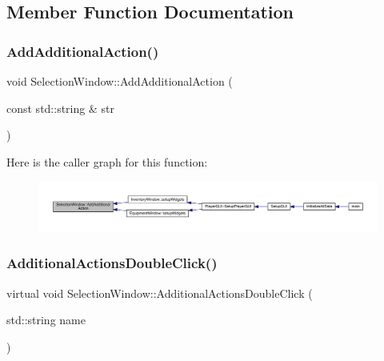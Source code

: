 \subsection{Member Function Documentation}
\mbox{\label{class_selection_window_ad520a06caa0f206afcd0f07eb2489066}} 
\subsubsection{\texorpdfstring{Add\+Additional\+Action()}{AddAdditionalAction()}}
{\footnotesize\ttfamily void Selection\+Window\+::\+Add\+Additional\+Action (\begin{DoxyParamCaption}\item[{const std\+::string \&}]{str }\end{DoxyParamCaption})}

Here is the caller graph for this function\+:
\nopagebreak
\begin{figure}[H]
\begin{center}
\leavevmode
\includegraphics[width=350pt]{db/d9c/class_selection_window_ad520a06caa0f206afcd0f07eb2489066_icgraph}
\end{center}
\end{figure}
\mbox{\label{class_selection_window_a853f6c1c78163cd976d8a7d7bf1a9153}} 
\subsubsection{\texorpdfstring{Additional\+Actions\+Double\+Click()}{AdditionalActionsDoubleClick()}}
{\footnotesize\ttfamily virtual void Selection\+Window\+::\+Additional\+Actions\+Double\+Click (\begin{DoxyParamCaption}\item[{std\+::string}]{name }\end{DoxyParamCaption})\hspace{0.3cm}{\ttfamily [pure virtual]}}



